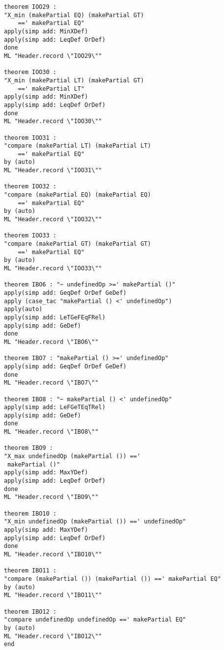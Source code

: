 \begin{multicols}{2}
\begin{Verbatim}
theorem IOO29 :
"X_min (makePartial EQ) (makePartial GT)
 	==' makePartial EQ"
apply(simp add: MinXDef)
apply(simp add: LeqDef OrDef)
done
ML "Header.record \"IOO29\""

theorem IOO30 :
"X_min (makePartial LT) (makePartial GT) 
	==' makePartial LT"
apply(simp add: MinXDef)
apply(simp add: LeqDef OrDef)
done
ML "Header.record \"IOO30\""

theorem IOO31 :
"compare (makePartial LT) (makePartial LT) 
	==' makePartial EQ"
by (auto)
ML "Header.record \"IOO31\""

theorem IOO32 :
"compare (makePartial EQ) (makePartial EQ) 
	==' makePartial EQ"
by (auto)
ML "Header.record \"IOO32\""

theorem IOO33 :
"compare (makePartial GT) (makePartial GT)
 	==' makePartial EQ"
by (auto)
ML "Header.record \"IOO33\""

theorem IBO6 : "~ undefinedOp >=' makePartial ()"
apply(simp add: GeqDef OrDef GeDef)
apply (case_tac "makePartial () <' undefinedOp")
apply(auto)
apply(simp add: LeTGeFEqFRel)
apply(simp add: GeDef)
done
ML "Header.record \"IBO6\""

theorem IBO7 : "makePartial () >=' undefinedOp"
apply(simp add: GeqDef OrDef GeDef)
done
ML "Header.record \"IBO7\""

theorem IBO8 : "~ makePartial () <' undefinedOp"
apply(simp add: LeFGeTEqTRel)
apply(simp add: GeDef)
done
ML "Header.record \"IBO8\""

theorem IBO9 :
"X_max undefinedOp (makePartial ()) =='
 makePartial ()"
apply(simp add: MaxYDef)
apply(simp add: LeqDef OrDef)
done
ML "Header.record \"IBO9\""

theorem IBO10 :
"X_min undefinedOp (makePartial ()) ==' undefinedOp"
apply(simp add: MaxYDef)
apply(simp add: LeqDef OrDef)
done
ML "Header.record \"IBO10\""

theorem IBO11 :
"compare (makePartial ()) (makePartial ()) ==' makePartial EQ"
by (auto)
ML "Header.record \"IBO11\""

theorem IBO12 :
"compare undefinedOp undefinedOp ==' makePartial EQ"
by (auto)
ML "Header.record \"IBO12\""
end
\end{Verbatim}
\end{multicols}

